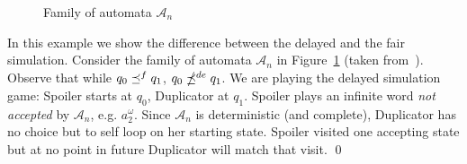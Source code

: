 \begin{figure}[h]
\centering
{}
\caption{Family of automata $\mathcal{A}_n$}
\label{fig:family-An-fair}
\end{figure}

\begin{example}
In this example we show the difference between the delayed and the fair simulation.
Consider the family of automata $\mathcal{A}_n$ in Figure~\ref{fig:family-An-fair}
(taken from~\cite{etessami2005fair}).
Observe that while $q_0 \preceq^{f} q_1$, $q_0 \npreceq^{de} q_1$.
We are playing the delayed simulation game: Spoiler starts at $q_0$,
Duplicator at $q_1$.
Spoiler plays an infinite word \emph{not accepted} by $\mathcal{A}_n$,
e.g. $a_2 ^{\omega}$.
Since $\mathcal{A}_n$ is deterministic (and complete), Duplicator has no choice but to self
loop on her starting state.
Spoiler visited one accepting state but at no point in future
Duplicator will match that visit.
\qed
\end{example}


